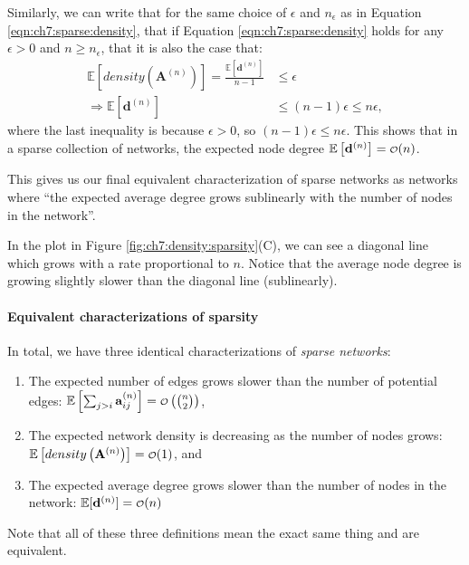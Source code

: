 Similarly, we can write that for the same choice of $\epsilon$ and $n_\epsilon$ as in Equation \eqref{eqn:ch7:sparse:density}, that if Equation \eqref{eqn:ch7:sparse:density} holds for any $\epsilon > 0$ and $n \geq n_\epsilon$, that it is also the case that:
\begin{align*}
    \mathbb E\left[density\left(\mathbf A^{(n)}\right)\right] = \frac{\mathbb E[\mathbf d^{(n)}]}{n - 1} &\leq \epsilon \\
    \Rightarrow \mathbb E[\mathbf d^{(n)}] &\leq (n - 1)\epsilon \leq n\epsilon,
\end{align*}
where the last inequality is because $\epsilon > 0$, so $(n - 1)\epsilon \leq n\epsilon$. This shows that in a sparse collection of networks, the expected node degree $\mathbb E\left[\mathbf d^{(n)}\right] = \smallO(n)$. 

This gives us our final equivalent characterization of sparse networks as networks where ``the expected average degree grows sublinearly with the number of nodes in the network''.

In the plot in Figure \ref{fig:ch7:density:sparsity}(C), we can see a diagonal line which grows with a rate proportional to $n$. Notice that the average node degree is growing slightly slower than the diagonal line (sublinearly).

\paragraph*{Equivalent characterizations of sparsity}
In total, we have three identical characterizations of \textit{sparse networks}:
\begin{enumerate}
    \item The expected number of edges grows slower than the number of potential edges: $\mathbb E\left[\sum_{j > i}\mathbf a_{ij}^{(n)}\right] = \smallO\left(\binom n 2\right)$,
    \item The expected network density is decreasing as the number of nodes grows: $\mathbb E\left[density\left(\mathbf A^{(n)}\right)\right] = \smallO(1)$, and
    \item The expected average degree grows slower than the number of nodes in the network: $\mathbb E[\mathbf d^{(n)}] = \smallO(n)$
\end{enumerate}
Note that all of these three definitions mean the exact same thing and are equivalent.

